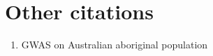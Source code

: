 \documentclass[a4paper, 10pt]{article}
\begin{document}
\section{Other citations}

\begin{enumerate}

   \item GWAS on Australian aboriginal population \cite{pmid25760438}

\end{enumerate}


\end{document}

